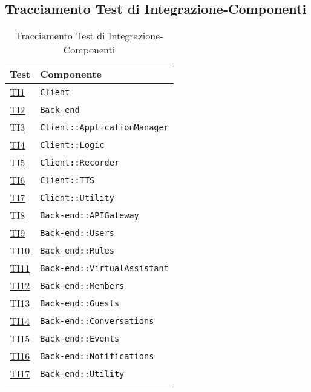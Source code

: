 \subsection{Tracciamento Test di Integrazione-Componenti}
\normalsize
\begin{longtable}{|>{\centering}m{3cm}|m{9cm}<{\centering}|}
\hline 
\textbf{Test} & \textbf{Componente}\\
\hline
\endhead
\hyperlink{TI1}{TI1} & \texttt{Client}\\ \hline
\hyperlink{TI2}{TI2} & \texttt{Back-end}\\ \hline
\hyperlink{TI3}{TI3} & \texttt{Client::ApplicationManager}\\ \hline
\hyperlink{TI4}{TI4} & \texttt{Client::Logic}\\ \hline
\hyperlink{TI5}{TI5} & \texttt{Client::Recorder}\\ \hline
\hyperlink{TI6}{TI6} & \texttt{Client::TTS}\\ \hline
\hyperlink{TI7}{TI7} & \texttt{Client::Utility}\\ \hline
\hyperlink{TI8}{TI8} & \texttt{Back-end::APIGateway}\\ \hline
\hyperlink{TI9}{TI9} & \texttt{Back-end::Users}\\ \hline
\hyperlink{TI10}{TI10} & \texttt{Back-end::Rules}\\ \hline
\hyperlink{TI11}{TI11} & \texttt{Back-end::VirtualAssistant}\\ \hline
\hyperlink{TI12}{TI12} & \texttt{Back-end::Members}\\ \hline
\hyperlink{TI13}{TI13} & \texttt{Back-end::Guests}\\ \hline
\hyperlink{TI14}{TI14} & \texttt{Back-end::Conversations}\\ \hline
\hyperlink{TI15}{TI15} & \texttt{Back-end::Events}\\ \hline
\hyperlink{TI16}{TI16} & \texttt{Back-end::Notifications}\\ \hline
\hyperlink{TI17}{TI17} & \texttt{Back-end::Utility}\\ \hline
\caption[Tracciamento Test di Integrazione-Componenti]{Tracciamento Test di Integrazione-Componenti}
\label{tabella:ts-requi}
\end{longtable}
\clearpage
